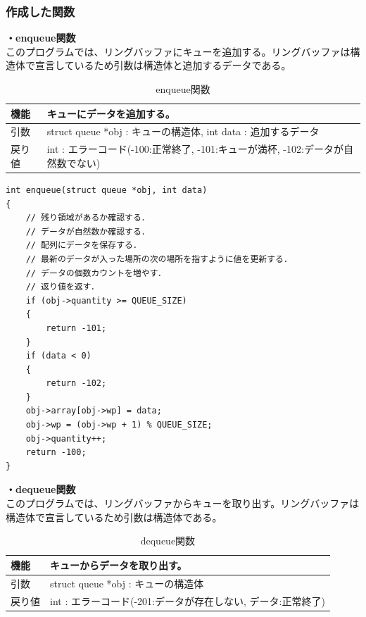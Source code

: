 \documentclass[dvipdfmx]{jsarticle}
\begin{document}
\subsubsection{作成した関数}
\textbf{・enqueue関数}\\
このプログラムでは、リングバッファにキューを追加する。リングバッファは構造体で宣言しているため引数は構造体と追加するデータである。
\begin{table}[ht]
  \centering
  \caption{enqueue関数}
  \begin{tabular}{|p{5cm}|p{10cm}|}
    \hline
    機能  & キューにデータを追加する。                                      \\
    \hline
    引数  & struct queue *obj : キューの構造体, int data : 追加するデータ \\
    \hline
    戻り値 & int : エラーコード(-100:正常終了, -101:キューが満杯, -102:データが自然数でない) \\
    \hline
  \end{tabular}
  \label{tab:enqueue_func_2}
\end{table}
\newpage
\begin{lstlisting}[caption={enqueue関数}, label={lst:enqueue_func_2}]
int enqueue(struct queue *obj, int data)
{
    // 残り領域があるか確認する．
    // データが自然数か確認する．
    // 配列にデータを保存する．
    // 最新のデータが入った場所の次の場所を指すように値を更新する．
    // データの個数カウントを増やす．
    // 返り値を返す．
    if (obj->quantity >= QUEUE_SIZE)
    {
        return -101;
    }
    if (data < 0)
    {
        return -102;
    }
    obj->array[obj->wp] = data;
    obj->wp = (obj->wp + 1) % QUEUE_SIZE;
    obj->quantity++;
    return -100;
}
\end{lstlisting}
\textbf{・dequeue関数}\\
このプログラムでは、リングバッファからキューを取り出す。リングバッファは構造体で宣言しているため引数は構造体である。
\begin{table}[ht]
  \centering
  \caption{dequeue関数}
  \begin{tabular}{|p{5cm}|p{10cm}|}
    \hline
    機能  & キューからデータを取り出す。                                      \\
    \hline
    引数  & struct queue *obj : キューの構造体 \\
    \hline
    戻り値 & int : エラーコード(-201:データが存在しない, データ:正常終了) \\
    \hline
  \end{tabular}
  \label{tab:dequeue_func_2}
\end{table}
\end{document}
